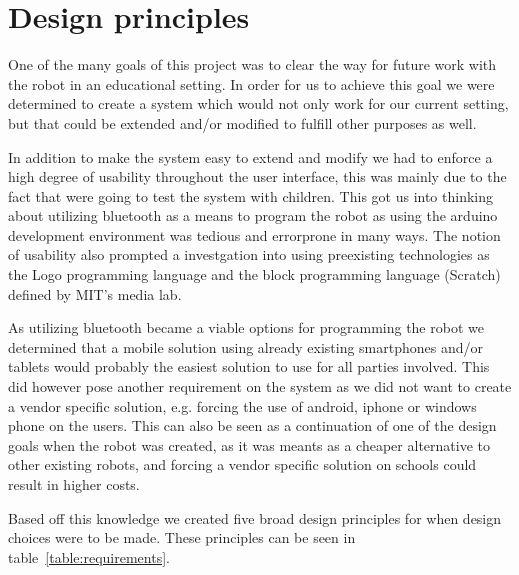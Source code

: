 \section{Design principles}\label{ch:principles}
One of the many goals of this project was to clear the way for future work with the \chirp robot in an educational setting. In order for us to achieve this goal we were determined to create a system which would not only work for our current setting, but that could be extended and/or modified to fulfill other purposes as well.

\bigskip\noindent
In addition to make the system easy to extend and modify we had to enforce a high degree of usability throughout the user interface, this was mainly due to the fact that were going to test the system with children. 
This got us into thinking about utilizing bluetooth as a means to program the robot as using the arduino development environment was tedious and errorprone in many ways. The notion of usability also prompted a investgation into using preexisting technologies as the Logo programming language and the block programming language (Scratch) defined by MIT's media lab. 

\bigskip\noindent
As utilizing bluetooth became a viable options for programming the robot we determined that a mobile solution using already existing smartphones and/or tablets would probably the easiest solution to use for all parties involved. This did however pose another requirement on the system as we did not want to create a vendor specific solution, e.g. forcing the use of android, iphone or windows phone on the users. 
This can also be seen as a continuation of one of the design goals when the \chirp robot was created, as it was meants as a cheaper alternative to other existing robots, and forcing a vendor specific solution on schools could result in higher costs.

\bigskip\noindent
Based off this knowledge we created five broad design principles for when design choices were to be made. These principles can be seen in table~\ref{table:requirements}.
